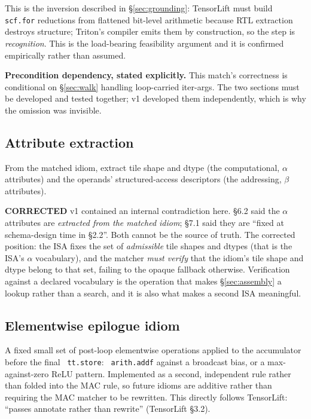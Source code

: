 \documentclass[11pt,a4paper]{article}
\newcommand{\code}[1]{\texttt{\small\hyphenchar\font=45 #1}}
\newcommand{\falsified}{\textbf{\textcolor{red!75!black}{CORRECTED}}}
\begin{document}
\noindent This is the inversion described in \S\ref{sec:grounding}: TensorLift must build \code{scf.for}
reductions from flattened bit-level arithmetic because RTL extraction destroys structure; Triton's compiler
emits them by construction, so the step is \emph{recognition}. This is the load-bearing feasibility argument
and it is confirmed empirically rather than assumed.

\noindent\textbf{Precondition dependency, stated explicitly.} This match's correctness is conditional on
\S\ref{sec:walk} handling loop-carried iter-args. The two sections must be developed and tested together;
v1 developed them independently, which is why the omission was invisible.

\subsection{Attribute extraction}

From the matched idiom, extract tile shape and dtype (the computational, $\alpha$ attributes) and the
operands' structured-access descriptors (the addressing, $\beta$ attributes).

\noindent\falsified{} v1 contained an internal contradiction here. \S6.2 said the $\alpha$ attributes are
\emph{extracted from the matched idiom}; \S7.1 said they are ``fixed at schema-design time in \S2.2''. Both
cannot be the source of truth. The corrected position: the ISA fixes the set of \emph{admissible} tile shapes
and dtypes (that is the ISA's $\alpha$ vocabulary), and the matcher \emph{must verify} that the idiom's tile
shape and dtype belong to that set, failing to the opaque fallback otherwise. Verification against a
declared vocabulary is the operation that makes \S\ref{sec:assembly} a lookup rather than a search, and it
is also what makes a second ISA meaningful.

\subsection{Elementwise epilogue idiom}

A fixed small set of post-loop elementwise operations applied to the accumulator before the final
\code{tt.store}: \code{arith.addf} against a broadcast bias, or a max-against-zero ReLU pattern. Implemented
as a second, independent rule rather than folded into the MAC rule, so future idioms are additive rather
than requiring the MAC matcher to be rewritten. This directly follows TensorLift: ``passes annotate rather
than rewrite'' (TensorLift \S3.2).
\end{document}
